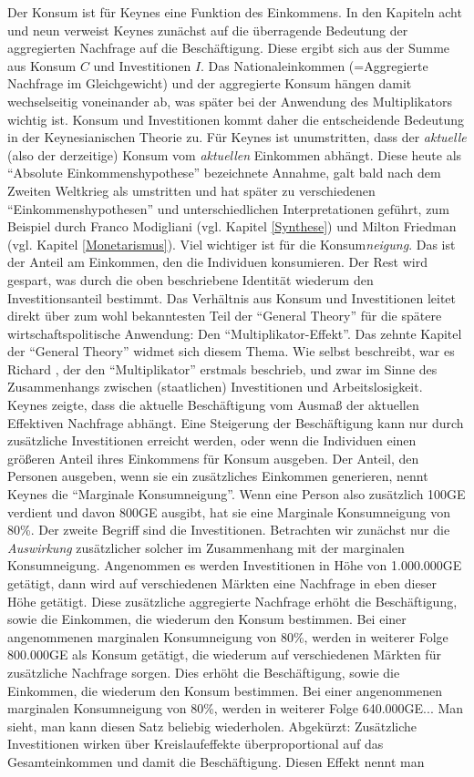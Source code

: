 Der Konsum ist für Keynes eine Funktion des Einkommens. In den Kapiteln acht und neun verweist Keynes zunächst auf die überragende Bedeutung der aggregierten Nachfrage auf die Beschäftigung. Diese ergibt sich aus der Summe aus Konsum $C$ und Investitionen $I$. Das Nationaleinkommen (=Aggregierte Nachfrage im Gleichgewicht) und der aggregierte Konsum hängen damit wechselseitig voneinander ab, was später bei der Anwendung des Multiplikators wichtig ist. Konsum und Investitionen kommt daher die entscheidende Bedeutung in der Keynesianischen Theorie zu. Für Keynes ist unumstritten, dass der \textit{aktuelle} (also der derzeitige) Konsum vom \textit{aktuellen} Einkommen abhängt. Diese heute als "`Absolute Einkommenshypothese"' bezeichnete Annahme, galt bald nach dem Zweiten Weltkrieg als umstritten und hat später zu verschiedenen "`Einkommenshypothesen"' und unterschiedlichen Interpretationen geführt, zum Beispiel durch Franco Modigliani (vgl. Kapitel \ref{Synthese}) und Milton Friedman (vgl. Kapitel \ref{Monetarismus}). Viel wichtiger ist für \textcite[S. 89, S. 107]{Keynes1936} die Konsum\textit{neigung}. Das ist der Anteil am Einkommen, den die Individuen konsumieren. Der Rest wird gespart, was durch die oben beschriebene Identität wiederum den Investitionsanteil bestimmt. Das Verhältnis aus Konsum und Investitionen leitet direkt über zum wohl bekanntesten Teil der "`General Theory"' für die spätere wirtschaftspolitische Anwendung: Den "`Multiplikator-Effekt"'. Das zehnte Kapitel der "`General Theory"' widmet sich diesem Thema. Wie \textcite[S. 114]{Keynes1936} selbst beschreibt, war es Richard \textcite{Kahn1931}, der den "`Multiplikator"' erstmals beschrieb, und zwar im Sinne des Zusammenhangs zwischen (staatlichen) Investitionen und Arbeitslosigkeit. Keynes zeigte, dass die aktuelle Beschäftigung vom Ausmaß der aktuellen Effektiven Nachfrage abhängt. Eine Steigerung der Beschäftigung kann nur durch zusätzliche Investitionen erreicht werden, oder wenn die Individuen einen größeren Anteil ihres Einkommens für Konsum ausgeben.  Der Anteil, den Personen ausgeben, wenn sie ein zusätzliches Einkommen generieren, nennt Keynes die "`Marginale Konsumneigung"'. Wenn eine Person also zusätzlich 100GE verdient und davon 800GE ausgibt, hat sie eine Marginale Konsumneigung von 80\%. Der zweite Begriff sind die Investitionen. Betrachten wir zunächst nur die \textit{Auswirkung} zusätzlicher solcher im Zusammenhang mit der marginalen Konsumneigung. Angenommen es werden Investitionen in Höhe von 1.000.000GE getätigt, dann wird auf verschiedenen Märkten eine Nachfrage in eben dieser Höhe getätigt. Diese zusätzliche aggregierte Nachfrage erhöht die Beschäftigung, sowie die Einkommen, die wiederum den Konsum bestimmen. Bei einer angenommenen marginalen Konsumneigung von 80\%, werden in weiterer Folge 800.000GE als Konsum getätigt, die wiederum auf verschiedenen Märkten für zusätzliche Nachfrage sorgen. Dies erhöht die Beschäftigung, sowie die Einkommen, die wiederum den Konsum bestimmen. Bei einer angenommenen marginalen Konsumneigung von 80\%, werden in weiterer Folge 640.000GE... Man sieht, man kann diesen Satz beliebig wiederholen. Abgekürzt: Zusätzliche Investitionen wirken über Kreislaufeffekte überproportional auf das Gesamteinkommen und damit die Beschäftigung. Diesen Effekt nennt man 